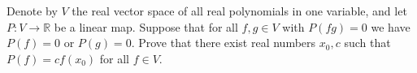 \documentclass{article}
\begin{document}
\setlength{\parindent}{0pt}
Denote by $V$ the real vector space of all real polynomials in one variable, and let $P:V\to\mathbb{R}$ be a linear map. Suppose that for all $f,g\in V$ with $P(fg)=0$ we have $P(f)=0$ or $P(g)=0$. Prove that there exist real numbers $x_{0},c$ such that $P(f)=cf(x_{0})$ for all $f\in V$.
\end{document}
